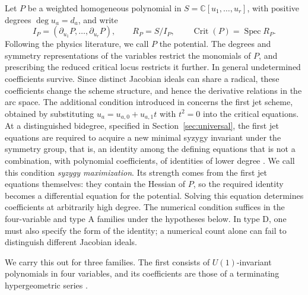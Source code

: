 \documentclass[10pt,reqno]{amsart}
\numberwithin{equation}{section}
\theoremstyle{plain}
\theoremstyle{definition}
\DeclareMathOperator{\Spec}{Spec}
\DeclareMathOperator{\Crit}{Crit}
\begin{document}
Let $P$ be a weighted homogeneous polynomial in $S=\mathbb{C}[u_1,\dots,u_r]$, with positive degrees $\deg u_a=d_a$, and write
\begin{equation*}
	I_P=(\partial_{u_1}P,\dots,\partial_{u_r}P),\qquad R_P=S/I_P,\qquad \Crit(P)=\Spec R_P .
\end{equation*}
Following the physics literature, we call $P$ the potential. The degrees and symmetry representations of the variables restrict the monomials of $P$, and prescribing the reduced critical locus restricts it further. In general undetermined coefficients survive. Since distinct Jacobian ideals can share a radical, these coefficients change the scheme structure, and hence the derivative relations in the arc space. The additional condition introduced in \cite{Kang:2026nge,KLSnonpoint} concerns the first jet scheme, obtained by substituting $u_a=u_{a,0}+u_{a,1}t$ with $t^2=0$ into the critical equations. At a distinguished bidegree, specified in Section~\ref{sec:universal}, the first jet equations are required to acquire a new minimal syzygy invariant under the symmetry group, that is, an identity among the defining equations that is not a combination, with polynomial coefficients, of identities of lower degree \cite{Eisenbud}. We call this condition \emph{syzygy maximization}. Its strength comes from the first jet equations themselves: they contain the Hessian of $P$, so the required identity becomes a differential equation for the potential. Solving this equation determines coefficients at arbitrarily high degree. The numerical condition suffices in the four-variable and type A families under the hypotheses below. In type D, one must also specify the form of the identity; a numerical count alone can fail to distinguish different Jacobian ideals.

We carry this out for three families. The first consists of $U(1)$-invariant polynomials in four variables, and its coefficients are those of a terminating hypergeometric series \cite{AAR}.
\end{document}
